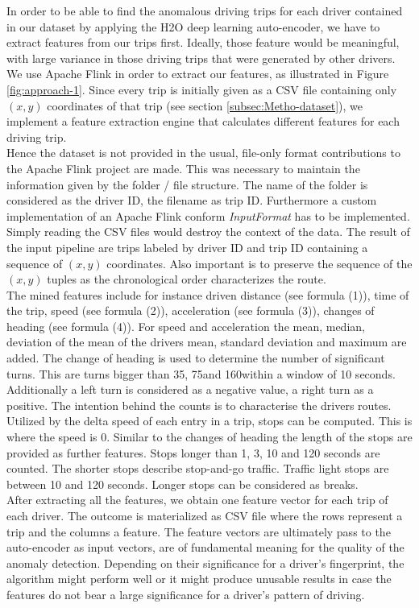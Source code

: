 \documentclass{vldb}
\begin{document}
In order to be able to find the anomalous driving trips for each driver contained in our dataset by applying the H2O deep learning auto-encoder, we have to extract features from our trips first. Ideally, those feature would be meaningful, with large variance in those driving trips that were generated by other drivers. We use Apache Flink in order to extract our features, as illustrated in Figure \ref{fig:approach-1}. Since every trip is initially given as a CSV file containing only $(x, y)$ coordinates of that trip (see section \ref{subsec:Metho-dataset}), we implement a feature extraction engine that calculates different features for each driving trip.\\
Hence the dataset is not provided in the usual, file-only format contributions to the Apache Flink project are made. This was necessary to maintain the information given by the folder / file structure. The name of the folder is considered as the driver ID, the filename as trip ID. Furthermore a custom implementation of an Apache Flink conform \textit{InputFormat} has to be implemented. Simply reading the CSV files would destroy the context of the data. The result of the input pipeline are trips labeled by driver ID and trip ID containing a sequence of $(x, y)$ coordinates. Also important is to preserve the sequence of the $(x, y)$ tuples as the chronological order characterizes the route.\\
The mined features include for instance driven distance (see formula (1)), time of the trip, speed (see formula (2)), acceleration (see formula (3)), changes of heading (see formula (4)). For speed and acceleration the mean, median, deviation of the mean of the drivers mean, standard deviation and maximum are added. The change of heading is used to determine the number of significant turns. This are turns bigger than 35\degree, 75\degree and 160\degree within a window of 10 seconds. Additionally a left turn is considered as a negative value, a right turn as a positive. The intention behind the counts is to characterise the drivers routes. Utilized by the delta speed of each entry in a trip, stops can be computed. This is where the speed is 0. Similar to the changes of heading the length of the stops are provided as further features. Stops longer than 1, 3, 10 and 120 seconds are counted. The shorter stops describe stop-and-go traffic. Traffic light stops are between 10 and 120 seconds. Longer stops can be considered as breaks.\\
After extracting all the features, we obtain one feature vector for each trip of each driver. The outcome is materialized as CSV file where the rows represent a trip and the columns a feature. The feature vectors are ultimately pass to the auto-encoder as input vectors, are of fundamental meaning for the quality of the anomaly detection. Depending on their significance for a driver's fingerprint, the algorithm might perform well or it might produce unusable results in case the features do not bear a large significance for a driver's pattern of driving.
\end{document}
